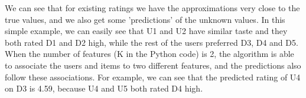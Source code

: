  We can see that for existing ratings we have the approximations very close to the true values, and we also get some 'predictions' of the unknown values. In this simple example, we can easily see that U1 and U2 have similar taste and they both rated D1 and D2 high, while the rest of the users preferred D3, D4 and D5. When the number of features (K in the Python code) is 2, the algorithm is able to associate the users and items to two different features, and the predictions also follow these associations. For example, we can see that the predicted rating of U4 on D3 is 4.59, because U4 and U5 both rated D4 high.

